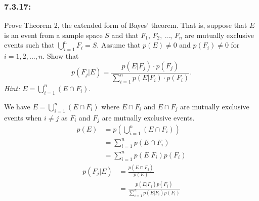 \documentclass[a4paper]{article}
\begin{document}
	\subsubsection*{7.3.17:}
	Prove Theorem 2, the extended form of Bayes' theorem. That is, suppose that $E$ is an event from a sample space $S$ and that $F_1$, $F_2$, ..., $F_n$ are mutually exclusive events such that $\bigcup_{i=1}^{n} F_i = S$. Assume that $p(E) \neq 0$ and $p(F_i) \neq 0$ for $i=1,2,...,n$. Show that
	\begin{equation*}
		p(F_j|E) = \frac{p(E|F_j)\cdot p(F_j)}{\sum_{i=1}^n p(E|F_i)\cdot p(F_i)}.
	\end{equation*}
	\emph{Hint: } $E=\bigcup_{i=1}^n (E\cap F_i)$.
	
	We have $E=\bigcup_{i=1}^n (E\cap F_i)$ where $E \cap F_i$ and $E \cap F_j$ are mutually exclusive events when $i \neq j$ as $F_i$ and $F_j$ are mutually exclusive events.
	\begin{align*}
	p(E) & = p(\bigcup_{i=1}^n (E\cap F_i)) \\
	& = \sum_{i=1}^n p(E \cap F_i) \\
	& = \sum_{i=1}^n p(E|F_i) p(F_i)
	\end{align*}
	\begin{align*}
	p(F_j|E) & = \frac{p(E \cap F_j)}{p(E)} \\
	& = \frac{p(E|F_j)p(F_j)}{\sum_{i=1}^n p(E|F_i)p(F_i)}
	\end{align*}
	
\end{document}

